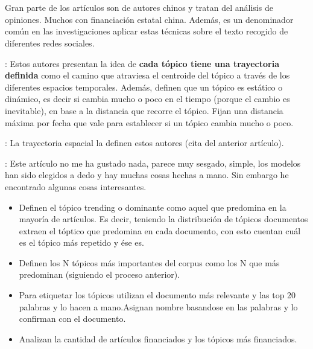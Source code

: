 \documentclass[a4paper,10pt]{article}
\title{}
\author{}
\begin{document}
\maketitle

\begin{abstract}

\end{abstract}

\section{}

Gran parte de los artículos son de autores chinos y tratan del análisis de opiniones. Muchos con financiación estatal china. Además, es un denominador común en las investigaciones aplicar estas técnicas sobre el texto recogido de diferentes redes sociales.

\cite{Yao2020}: Estos autores presentan la idea de \textbf{cada tópico tiene una trayectoria definida} como el camino que atraviesa el centroide del tópico a través de los diferentes espacios temporales. Además, definen que un tópico es estático o dinámico, es decir si cambia mucho o poco en el tiempo (porque el cambio es inevitable), en base a la distancia que recorre el tópico. Fijan una distancia máxima por fecha que vale para establecer si un tópico cambia mucho o poco.

\cite{Lee2011}: La trayectoria espacial la definen estos autores (cita del anterior artículo).

\cite{Alazba2022}: Este artículo no me ha gustado nada, parece muy sesgado, simple, los modelos han sido elegidos a dedo y hay muchas cosas hechas a mano. Sin embargo he encontrado algunas cosas interesantes.
\begin{itemize}
 \item Definen el tópico trending o dominante como aquel que predomina en la mayoría de artículos. Es decir, teniendo la distribución de tópicos documentos extraen el tóptico que predomina en cada documento, con esto cuentan cuál es el tópico más repetido y ése es.
 \item Definen los N tópicos más importantes del corpus como los N que más predominan (siguiendo el proceso anterior).
 \item Para etiquetar los tópicos utilizan el documento más relevante y las top 20 palabras y lo hacen a mano.Asignan nombre basandose en las palabras y lo confirman con el documento.
 \item Analizan la cantidad de artículos financiados y los tópicos más financiados.
\end{itemize}
\end{document}

